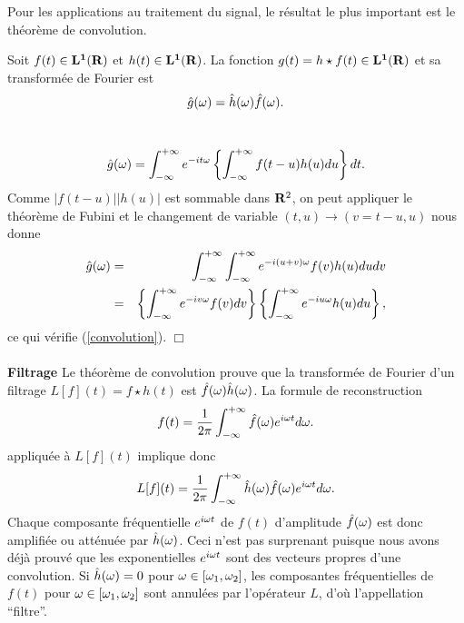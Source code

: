Pour les applications au traitement du signal, 
le r\'esultat le plus important est 
le th\'eor\`eme de convolution.

\begin{theorem} [Convolution]
\label{th_convol}
Soit $f(t) \in {\bf L ^ 1 ({\bf{R}})}$ et $h(t) \in {\bf L ^ 1 ({\bf{R}})}$. La
fonction $g(t) = h \star f (t) \in {\bf L ^ 1 ({\bf{R}})}$ et sa transform\'ee de
Fourier est 
\begin{equation}
\label{convolution}
\hat g ({\omega}) = \hat h({\omega}) \hat f({\omega}) .
\end{equation}
\end{theorem}

 \\
\[
\hat g ({\omega}) = \int_{-\infty}^{+\infty} e ^{-it{\omega}}
\left \{ \int_{-\infty}^{+\infty} f(t-u) h(u) du \right\} dt .
\]
Comme $|f(t-u)| |h(u)|$ est sommable dans ${\bf{R}}^2$, on peut
appliquer le th\'eor\`eme de Fubini et le changement de
variable $(t,u) \rightarrow (v=t-u,u)$ nous donne
\begin{eqnarray*}
\hat g ({\omega}) & = & \int_{-\infty}^{+\infty} 
\int_{-\infty}^{+\infty} e ^{-i(u+v){\omega}} f(v) h(u) du dv \\
& = &
\left\{\int_{-\infty}^{+\infty} e ^{-iv{\omega}} f(v) dv \right\}
\left\{\int_{-\infty}^{+\infty} e ^{-iu{\omega}} h(u) du \right\} ,
\end{eqnarray*}
ce qui v\'erifie (\ref{convolution}). $\Box$
\\
\\
{\bf Filtrage}
Le th\'eor\`eme de convolution prouve que
la transform\'ee de Fourier d'un filtrage
$L[f] (t) = f \star h (t)$ est $\hat f({\omega}) \hat h({\omega})$.
La formule 
de reconstruction 
\begin{equation}
f ( t ) = \frac 1 {2 \pi} \int_{- \infty}^{+ \infty} 
\hat f({\omega} ) e^{i {\omega} t} d {\omega} .
\end{equation}
appliqu\'ee \`a $L[f](t)$ implique donc
\begin{equation}
L[f] ( t ) = \frac 1 {2 \pi} \int_{- \infty}^{+ \infty} 
\hat h({\omega}) \hat f({\omega} ) e^{i {\omega} t} d {\omega} .
\end{equation}
Chaque composante fr\'equentielle $e^{i {\omega} t}$ de $f(t)$ 
d'amplitude $\hat f({\omega})$ est
donc amplifi\'ee ou att\'enu\'ee par $\hat h({\omega})$. Ceci n'est pas
surprenant puisque nous avons d\'ej\`a prouv\'e que 
les exponentielles $e^{i {\omega} t}$ sont des
vecteurs propres d'une convolution.
Si $\hat h({\omega}) = 0$ pour ${\omega} \in [{\omega}_1,{\omega}_2]$, les 
composantes fr\'equentielles de $f(t)$
pour ${\omega} \in [{\omega}_1,{\omega}_2]$ sont annul\'ees par l'op\'erateur
$L$, d'o\`u l'appellation ``filtre''.

